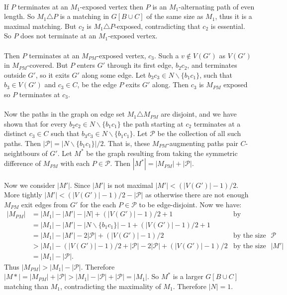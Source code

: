 \documentclass[letterpaper,12pt,oneside,onecolumn]{report}
\begin{document}
\paragraph{}
If $P$ terminates at an $M_1$-exposed vertex then $P$ is an $M_1$-alternating path of even length. So $M_1 \triangle P$ is a matching in $G[B \cup C]$ of the same size as $M_1$, thus it is a maximal matching. But $c_2$ is $M_1 \triangle P$-exposed, contradicting that $c_2$ is essential.
So $P$ does not terminate at an $M_1$-exposed vertex.
\paragraph{}
Then $P$ terminates at an $M_{PM}$-exposed vertex, $c_3$. Such a $v \not\in V(G')$ as $V(G')$ in $M_{PM}$-covered. But $P$ enters $G'$ through its first edge, $b_2c_2$, and terminates outside $G'$, so it exits $G'$ along some edge. Let $b_3c_3 \in N\backslash \{b_1c_1\}$, such that $b_3 \in V(G')$ and $c_3 \in C$, be the edge $P$ exits $G'$ along. Then $c_3$ is $M_{PM}$ exposed so $P$ terminates at $c_3$.
\paragraph{}
Now the paths in the graph on edge set $M_1 \triangle M_{PM}$ are disjoint, and we have shown that for every $b_2c_2 \in N \backslash \{b_1c_1\}$ the path starting at $c_2$ terminates at a distinct $c_3 \in C$ such that $b_3c_3 \in N \backslash \{b_1c_1\}$. Let $\mathcal{P}$ be the collection of all such paths. Then $|\mathcal{P}| = |N \backslash \{b_1c_1\}|/2$. That is, these $M_{PM}$-augmenting paths pair $C$-neightbours of $G'$. Let $M^*$ be the graph resulting from taking the symmetric difference of $M_{PM}$ with each $P \in \mathcal{P}$. Then $|M^*| = |M_{PM}| + |\mathcal{P}|$.
\paragraph{}
Now we consider $|M'|$. Since $|M'|$ is not maximal $|M'| < (|V(G')| - 1)/2$. More tightly $|M'| < (|V(G')| - 1)/2 - |\mathcal{P}|$ as otherwise there are not enough $M_{PM}$ exit edges from $G'$ for the each $P \in \mathcal{P}$ to be edge-disjoint. Now we have:
\begin{align*}
|M_{PM}| &= |M_1| -|M'| - |N| + (|V(G')| - 1)/2  + 1 &\text{by construction}\\
&= |M_1| - |M'| - |N \backslash \{b_1c_1\}| - 1  + (|V(G')| - 1)/2  + 1 \\
&= |M_1| - |M'| - 2|\mathcal{P}| + (|V(G')| - 1)/2 &\text{by the size of $\mathcal{P}$}\\
&> |M_1| - (|V(G')| - 1)/2 + |\mathcal{P}| - 2|\mathcal{P}| + (|V(G')| - 1)/2  &\text{by the size of $|M'|$}\\
&= |M_1| - |\mathcal{P}|.
\end{align*}
Thus $|M_{PM}| > |M_1| - |\mathcal{P}|$. Therefore $|M*| = |M_{PM}| + |\mathcal{P}| > |M_1| - |\mathcal{P}| + |\mathcal{P}| = |M_1|$. So $M^*$ is a larger $G[B \cup C]$ matching than $M_1$, contradicting the maximality of $M_1$. Therefore $|N| = 1$.
\end{document}

